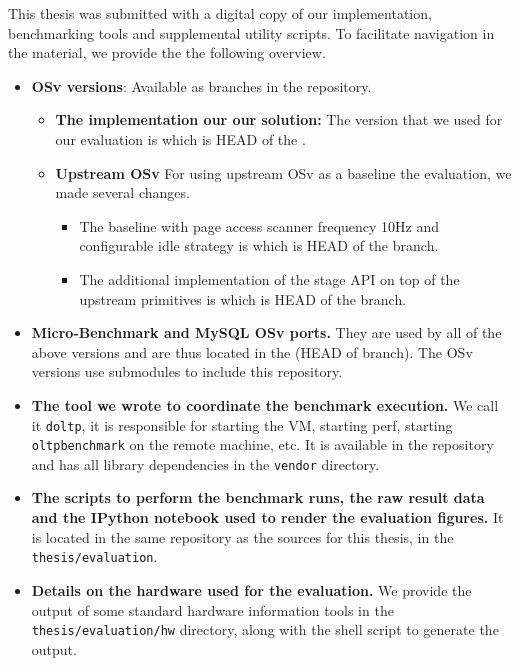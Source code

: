 \documentclass[12pt,a4paper]{book}
\begin{document}
This thesis was submitted with a digital copy of our implementation, benchmarking tools and supplemental utility scripts.
To facilitate navigation in the material, we provide the the following overview.

\begin{itemize}
    \item \textbf{OSv versions}:
        Available as branches in the  repository.
    \begin{itemize}
        \item \textbf{The implementation our our solution:}
            The version that we used for our evaluation is  which is HEAD of the .
        \item \textbf{Upstream OSv}
            For using upstream OSv as a baseline the evaluation, we made several changes.
            \begin{itemize}
                \item The baseline with page access scanner frequency 10Hz and configurable idle strategy is  which is HEAD of the  branch.

                \item The additional implementation of the stage API on top of the upstream primitives is  which is HEAD of the  branch.
            \end{itemize}
    \end{itemize}

    \item \textbf{Micro-Benchmark and MySQL OSv ports.}
        They are used by all of the above versions and are thus located in the  (HEAD of  branch).
        The OSv versions use submodules to include this repository.

    \item \textbf{The tool we wrote to coordinate the benchmark execution.}
        We call it \texttt{doltp}, it is responsible for starting the VM, starting perf, starting \texttt{oltpbenchmark} on the remote machine, etc.
        It is available in the  repository and has all library dependencies in the \texttt{vendor} directory.

    \item \textbf{The scripts to perform the benchmark runs, the raw result data and the IPython notebook used to render the evaluation figures.}
        It is located in the same repository as the \latex sources for this thesis, in the \texttt{thesis/evaluation}.

    \item \textbf{Details on the hardware used for the evaluation.}
        We provide the output of some standard hardware information tools in the \texttt{thesis/evaluation/hw} directory, along with the shell script to generate the output.

\end{itemize}

\cleardoublepage
{}
{}
\printbibliography
\end{document}
